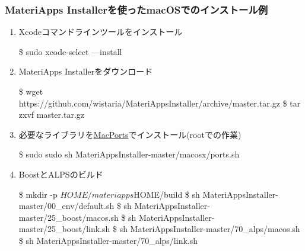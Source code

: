 \begin{frame}
  \frametitle{MateriApps Installerを使ったmacOSでのインストール例}
  \begin{enumerate}
  \item Xcodeコマンドラインツールをインストール
\begin{semiverbatim}
\$ sudo xcode-select —install
\end{semiverbatim}
  \item MateriApps Installerをダウンロード
\begin{semiverbatim}
\$ wget https://github.com/wistaria/MateriAppsInstaller/archive/master.tar.gz
\$ tar zxvf master.tar.gz
\end{semiverbatim}
  \item 
    必要なライブラリを\href{http://www.macports.org/}{MacPorts}でインストール(rootでの作業)
\begin{semiverbatim}
\$ sudo sudo sh MateriAppsInstaller-master/macosx/ports.sh
\end{semiverbatim}
  \item BoostとALPSのビルド
\begin{semiverbatim}
\$ mkdir -p $HOME/materiapps $HOME/build
\$ sh MateriAppsInstaller-master/00_env/default.sh
\$ sh MateriAppsInstaller-master/25_boost/macos.sh
\$ sh MateriAppsInstaller-master/25_boost/link.sh
\$ sh MateriAppsInstaller-master/70_alps/macos.sh
\$ sh MateriAppsInstaller-master/70_alps/link.sh
\end{semiverbatim}
  \end{enumerate}
\end{frame}


